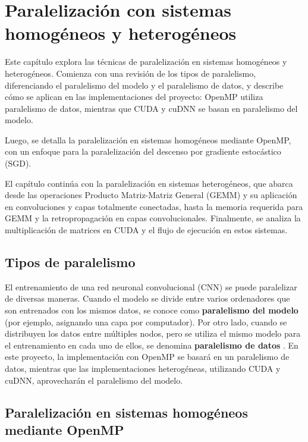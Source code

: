 \chapter{Paralelización con sistemas homogéneos y heterogéneos}

Este capítulo explora las técnicas de paralelización en sistemas homogéneos y heterogéneos. Comienza con una revisión de los tipos de paralelismo, diferenciando el paralelismo del modelo y el paralelismo de datos, y describe cómo se aplican en las implementaciones del proyecto: OpenMP utiliza paralelismo de datos, mientras que CUDA y cuDNN se basan en paralelismo del modelo.

Luego, se detalla la paralelización en sistemas homogéneos mediante OpenMP, con un enfoque para la paralelización del descenso por gradiente estocástico (SGD).

El capítulo continúa con la paralelización en sistemas heterogéneos, que abarca desde las operaciones Producto Matriz-Matriz General (GEMM) y su aplicación en convoluciones y capas totalmente conectadas, hasta la memoria requerida para GEMM y la retropropagación en capas convolucionales. Finalmente, se analiza la multiplicación de matrices en CUDA y el flujo de ejecución en estos sistemas.


\section{Tipos de paralelismo}

El entrenamiento de una red neuronal convolucional (CNN) se puede paralelizar de diversas maneras. Cuando el modelo se divide entre varios ordenadores que son entrenados con los mismos datos, se conoce como \textbf{paralelismo del modelo} \cite{data_model_parallelism} (por ejemplo, asignando una capa por computador). Por otro lado, cuando se distribuyen los datos entre múltiples nodos, pero se utiliza el mismo modelo para el entrenamiento en cada uno de ellos, se denomina \textbf{paralelismo de datos} \cite{model_parallelism}. En este proyecto, la implementación con OpenMP se basará en un paralelismo de datos, mientras que las implementaciones heterogéneas, utilizando CUDA y cuDNN, aprovecharán el paralelismo del modelo. \\

\section{Paralelización en sistemas homogéneos mediante OpenMP}

